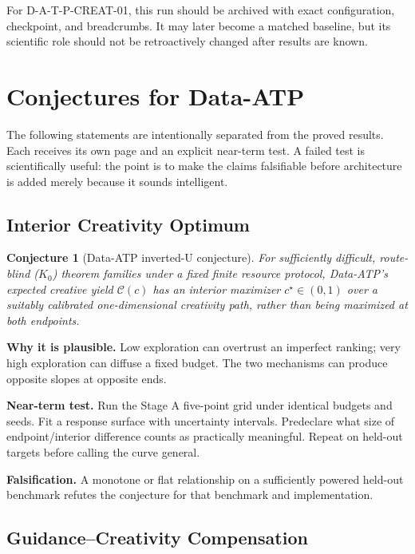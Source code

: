 \documentclass[11pt]{article}
\theoremstyle{datatheorem}
\newtheorem{conjecture}{Conjecture}[section]
\theoremstyle{definition}
\newcommand{\cY}{\mathcal{C}}
\begin{document}
For D-A-T-P-CREAT-01, this run should be archived with exact configuration, checkpoint, and breadcrumbs. It may later become a matched baseline, but its scientific role should not be retroactively changed after results are known.

\section{Conjectures for Data-ATP}

The following statements are intentionally separated from the proved results. Each receives its own page and an explicit near-term test. A failed test is scientifically useful: the point is to make the claims falsifiable before architecture is added merely because it sounds intelligent.

\clearpage
\subsection{Interior Creativity Optimum}

\begin{conjecture}[Data-ATP inverted-U conjecture]\label{conj:u}
For sufficiently difficult, route-blind ($K_0$) theorem families under a fixed finite resource protocol, Data-ATP's expected creative yield $\cY(c)$ has an interior maximizer $c^\star\in(0,1)$ over a suitably calibrated one-dimensional creativity path, rather than being maximized at both endpoints.
\end{conjecture}

\textbf{Why it is plausible.} Low exploration can overtrust an imperfect ranking; very high exploration can diffuse a fixed budget. The two mechanisms can produce opposite slopes at opposite ends.

\textbf{Near-term test.} Run the Stage A five-point grid under identical budgets and seeds. Fit a response surface with uncertainty intervals. Predeclare what size of endpoint/interior difference counts as practically meaningful. Repeat on held-out targets before calling the curve general.

\textbf{Falsification.} A monotone or flat relationship on a sufficiently powered held-out benchmark refutes the conjecture for that benchmark and implementation.

\clearpage
\subsection{Guidance--Creativity Compensation}
\end{document}
